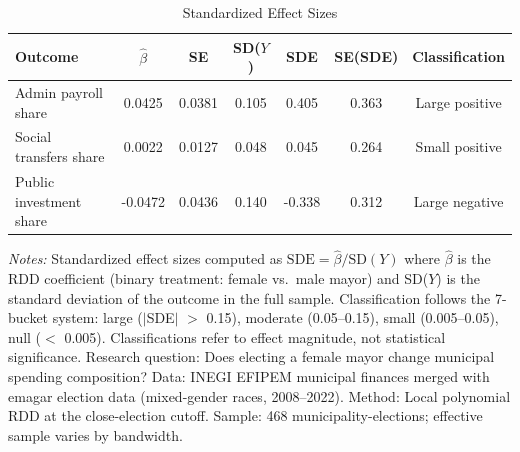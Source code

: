 \begin{table}[htbp]
\centering
\begin{threeparttable}
\caption{Standardized Effect Sizes}
\label{tab:sde}
\begin{tabular}{lcccccc}
\toprule
Outcome & $\hat{\beta}$ & SE & SD($Y$) & SDE & SE(SDE) & Classification \\
\midrule
Admin payroll share & 0.0425 & 0.0381 & 0.105 & 0.405 & 0.363 & Large positive \\
Social transfers share & 0.0022 & 0.0127 & 0.048 & 0.045 & 0.264 & Small positive \\
Public investment share & -0.0472 & 0.0436 & 0.140 & -0.338 & 0.312 & Large negative \\
\bottomrule
\end{tabular}
\begin{tablenotes}[flushleft]
\small
\item \textit{Notes:} Standardized effect sizes computed as $\text{SDE} = \hat{\beta} / \text{SD}(Y)$ where $\hat{\beta}$ is the RDD coefficient (binary treatment: female vs.\ male mayor) and SD($Y$) is the standard deviation of the outcome in the full sample. Classification follows the 7-bucket system: large ($|$SDE$|$ $>$ 0.15), moderate (0.05--0.15), small (0.005--0.05), null ($<$ 0.005). Classifications refer to effect magnitude, not statistical significance. Research question: Does electing a female mayor change municipal spending composition? Data: INEGI EFIPEM municipal finances merged with emagar election data (mixed-gender races, 2008--2022). Method: Local polynomial RDD at the close-election cutoff. Sample: 468 municipality-elections; effective sample varies by bandwidth.
\end{tablenotes}
\end{threeparttable}
\end{table}
